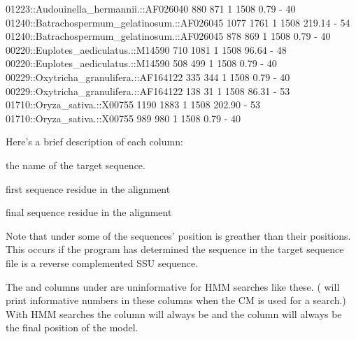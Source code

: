 \begin{sreoutputtiny}
  01223::Audouinella_hermannii.::AF026040               880         871      1   1508      0.79         -   40
  01240::Batrachospermum_gelatinosum.::AF026045        1077        1761      1   1508    219.14         -   54
  01240::Batrachospermum_gelatinosum.::AF026045         878         869      1   1508      0.79         -   40
  00220::Euplotes_aediculatus.::M14590                  710        1081      1   1508     96.64         -   48
  00220::Euplotes_aediculatus.::M14590                  508         499      1   1508      0.79         -   40
  00229::Oxytricha_granulifera.::AF164122               335         344      1   1508      0.79         -   40
  00229::Oxytricha_granulifera.::AF164122               138          31      1   1508     86.31         -   53
  01710::Oryza_sativa.::X00755                         1190        1883      1   1508    202.90         -   53
  01710::Oryza_sativa.::X00755                          989         980      1   1508      0.79         -   40
\end{sreoutputtiny}

Here's a brief description of each column:

\begin{wideitem}
\item[\emprog{target name}] the name of the target sequence.

\item[\emprog{start (target coord)}] first sequence residue in the alignment

\item[\emprog{end (target coord)}] final sequence residue in the alignment
\end{wideitem}

Note that under  some of the sequences'  position is
greather than their  positions. This occurs if the program
has determined the sequence in the target sequence file is a reverse
complemented SSU sequence. 

The  and  columns under  are
uninformative for HMM searches like these.
( will print informative numbers in
these columns when the CM is used for a search.) With HMM searches the
 column will always be  and the  column
will always be the final position of the model.

